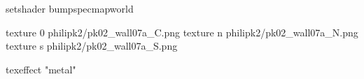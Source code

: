 setshader bumpspecmapworld

texture 0 philipk2/pk02_wall07a_C.png
texture n philipk2/pk02_wall07a_N.png
texture s philipk2/pk02_wall07a_S.png

texeffect "metal"
